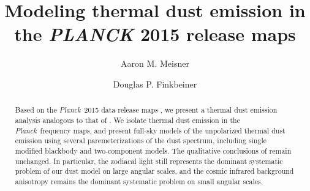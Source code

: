 \documentclass{emulateapj}
\newcommand{\IRAS}{{\it IRAS}}
\newcommand{\PLANCK}{{\it Planck}}
\begin{document}
\title{Modeling thermal dust emission in the {\it PLANCK} 2015 release maps}
\author{Aaron M. Meisner}
\author{Douglas P. Finkbeiner}

\begin{abstract}

Based on the \PLANCK~2015 data release maps \citep{planck2015}, we present a 
thermal dust emission analysis analogous to that of \cite{meisner15}. We 
isolate thermal dust emission in the \PLANCK~frequency maps, and present 
full-sky models of the unpolarized thermal dust emission using several 
paremeterizations of the dust spectrum, including single modified blackbody and
two-component models. The qualitative conclusions of \cite{meisner15} remain 
unchanged. In particular, the zodiacal light still represents the dominant 
systematic problem of our dust model on large angular scales, and the cosmic 
infrared background anisotropy remains the dominant systematic problem on small
angular scales.


\end{abstract}
\end{document}
